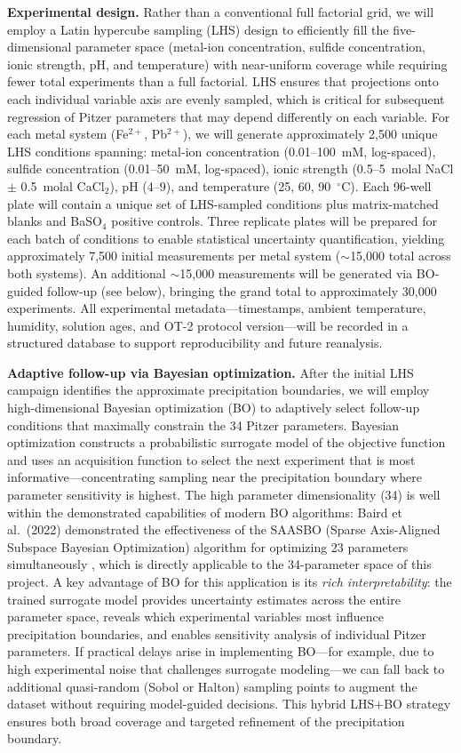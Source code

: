 \documentclass[12pt]{article}
\begin{document}
\textbf{Experimental design.} Rather than a conventional full factorial grid, we will employ a Latin hypercube sampling (LHS) design \cite{mckay1979} to efficiently fill the five-dimensional parameter space (metal-ion concentration, sulfide concentration, ionic strength, pH, and temperature) with near-uniform coverage while requiring fewer total experiments than a full factorial. LHS ensures that projections onto each individual variable axis are evenly sampled, which is critical for subsequent regression of Pitzer parameters that may depend differently on each variable. For each metal system (Fe$^{2+}$, Pb$^{2+}$), we will generate approximately 2,500 unique LHS conditions spanning: metal-ion concentration (0.01--100~mM, log-spaced), sulfide concentration (0.01--50~mM, log-spaced), ionic strength (0.5--5~molal NaCl $\pm$ 0.5~molal CaCl$_2$), pH (4--9), and temperature (25, 60, 90~$^\circ$C). Each 96-well plate will contain a unique set of LHS-sampled conditions plus matrix-matched blanks and BaSO$_4$ positive controls. Three replicate plates will be prepared for each batch of conditions to enable statistical uncertainty quantification, yielding approximately 7,500 initial measurements per metal system ($\sim$15,000 total across both systems). An additional $\sim$15,000 measurements will be generated via BO-guided follow-up (see below), bringing the grand total to approximately 30,000 experiments. All experimental metadata---timestamps, ambient temperature, humidity, solution ages, and OT-2 protocol version---will be recorded in a structured database to support reproducibility and future reanalysis.

\textbf{Adaptive follow-up via Bayesian optimization.} After the initial LHS campaign identifies the approximate precipitation boundaries, we will employ high-dimensional Bayesian optimization (BO) to adaptively select follow-up conditions that maximally constrain the 34 Pitzer parameters. Bayesian optimization constructs a probabilistic surrogate model of the objective function and uses an acquisition function to select the next experiment that is most informative---concentrating sampling near the precipitation boundary where parameter sensitivity is highest. The high parameter dimensionality (34) is well within the demonstrated capabilities of modern BO algorithms: Baird et al.\ (2022) demonstrated the effectiveness of the SAASBO (Sparse Axis-Aligned Subspace Bayesian Optimization) algorithm for optimizing 23 parameters simultaneously \cite{baird2022,eriksson2021}, which is directly applicable to the 34-parameter space of this project. A key advantage of BO for this application is its \textit{rich interpretability}: the trained surrogate model provides uncertainty estimates across the entire parameter space, reveals which experimental variables most influence precipitation boundaries, and enables sensitivity analysis of individual Pitzer parameters. If practical delays arise in implementing BO---for example, due to high experimental noise that challenges surrogate modeling---we can fall back to additional quasi-random (Sobol or Halton) sampling points to augment the dataset without requiring model-guided decisions. This hybrid LHS$+$BO strategy ensures both broad coverage and targeted refinement of the precipitation boundary.
\end{document}
